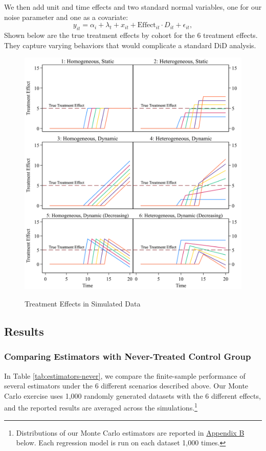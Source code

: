 \documentclass[12pt]{article}
\begin{document}
We then add unit and time effects and two standard normal variables, one for our noise parameter and one as a covariate:
\begin{equation}
     y_{it} = \alpha_i + \lambda_t + x_{it} + \text{Effect}_{it} \cdot D_{it} + \epsilon_{it},
\end{equation}
Shown below are the true treatment effects by cohort for the 6 treatment effects. They capture varying behaviors that would complicate a standard DiD analysis.
\begin{figure}[H]
    \centering
    \caption{Treatment Effects in Simulated Data}
    \includegraphics[width=6in]{Figures/Table 1 Treatment Effects Chart.png}
    \label{fig:treat-effects}
\end{figure}
\subsection{Results}
\subsubsection{Comparing Estimators with Never-Treated Control Group}
In Table \ref{tab:estimators-never}, we compare the finite-sample performance of several estimators under the 6 different scenarios described above. Our Monte Carlo exercise uses 1,000 randomly generated datasets with the 6 different effects, and the reported results are averaged across the simulations.\footnote{Distributions of our Monte Carlo estimators are reported in \hyperref[sec:appendixb]{Appendix B} below. Each regression model is run on each dataset 1,000 times.}
\end{document}
